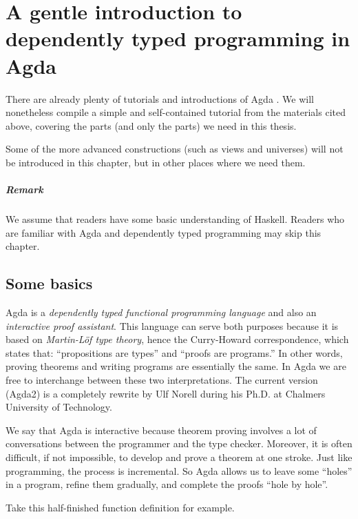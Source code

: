 \documentclass[\main/thesis.tex]{subfiles}
\begin{document}
\chapter{A gentle introduction to dependently typed programming in Agda}\label{agda}

There are already plenty of tutorials and introductions of Agda
\cite{norell2009dependently}\cite{FLOLAC16DTP}\cite{brutal}.
We will nonetheless compile a simple and self-contained tutorial from the
materials cited above, covering the parts (and only the parts) we need in this thesis.

Some of the more advanced constructions (such as views and universes) will not
be introduced in this chapter, but in other places where we need them.

\paragraph{Remark}
We assume that readers have some basic understanding of Haskell. Readers who are
familiar with Agda and dependently typed programming may skip this chapter.

\section{Some basics}


Agda is a \textit{dependently typed functional programming language} and also an
\textit{interactive proof assistant}. This language can serve both purposes because
it is based on \textit{Martin-Löf type theory}\cite{martin1984intuitionistic},
hence the Curry-Howard correspondence\cite{sorensen2006lectures},
which states that: ``propositions are types'' and ``proofs are programs.''
In other words, proving theorems and writing programs are essentially the same.
In Agda we are free to interchange between these two interpretations.
The current version (Agda2) is a completely rewrite by Ulf Norell during his
Ph.D. at Chalmers University of Technology.

We say that Agda is interactive because theorem proving involves a lot of
conversations between the programmer and the type checker.
Moreover, it is often difficult, if not impossible, to develop and prove a theorem at one stroke.
Just like programming, the process is incremental.
So Agda allows us to leave some ``holes'' in a program, refine them gradually, and
complete the proofs ``hole by hole''.

Take this half-finished function definition for example.
\end{document}
